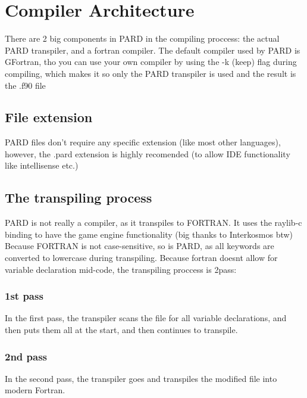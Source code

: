 \documentclass[11pt,a4paper]{article}
\begin{document}
\section{Compiler Architecture}
There are 2 big components in PARD in the compiling proccess: the actual PARD transpiler, and a fortran compiler.
The default compiler used by PARD is GFortran,
tho you can use your own compiler by using the -k (keep) flag during compiling, which makes it so only the PARD transpiler is used and the result is the .f90 file
\subsection{File extension}
PARD files don't require any specific extension (like most other languages), however, the .pard extension is highly recomended (to allow IDE functionality like intellisense etc.)
\subsection{The transpiling process}
PARD is not really a compiler, as it transpiles to FORTRAN.
It uses the raylib-c binding to have the game engine functionality (big thanks to Interkosmos btw)
Because FORTRAN is not case-sensitive, so is PARD, as all keywords are converted to lowercase during transpiling.
Because fortran doesnt allow for variable declaration mid-code, the transpiling proccess is 2pass:
\subsubsection{1st pass}
In the first pass, the transpiler scans the file for all variable declarations, and then puts them all at the start, and then continues to transpile.
\subsubsection{2nd pass}
In the second pass, the transpiler goes and transpiles the modified file into modern Fortran.
\end{document}
